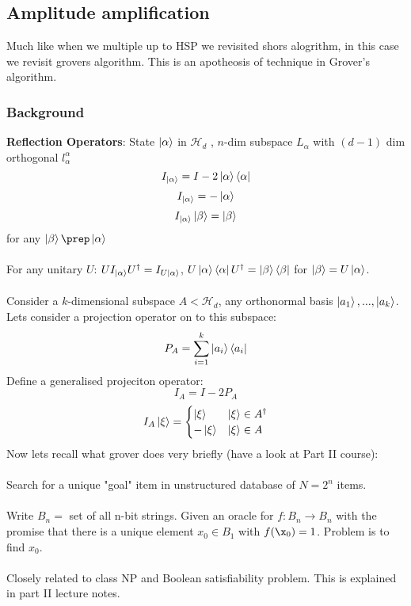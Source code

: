 \documentclass{article}
\begin{document}
               \subsection{Amplitude amplification}
Much like when we multiple up to HSP we revisited shors alogrithm, in this case we revisit grovers algorithm. This is an apotheosis of technique in Grover's algorithm.
\subsubsection{Background}
\textbf{Reflection Operators}:
State $\ket{\alpha}$ in $\mathcal{H}_{d}$ , $n$-dim subspace $L_{\alpha}$ with $(d-1)$ dim orthogonal $l_{\alpha}^{\alpha}$
$$
I_{\ket{\alpha}} = I - 2 \ket{\alpha} \bra{\alpha}
$$
$$
I_{\ket{\alpha}} = - \ket{\alpha}
$$
$$
I_{\ket{\alpha}} \ket{\beta} = \ket{\beta}
$$
for any $\ket{\beta} \prep \ket{\alpha}$\\\\
For any unitary $U$: $UI_{\ket{\alpha}} U^{\dagger} = I_{U\ket{\alpha}}$, $U \ket{\alpha} \bra{\alpha} U^{\dagger} = \ket{\beta} \bra{\beta}$ for $\ket{\beta} = U\ket{\alpha}$.\\\\
Consider a $k$-dimensional subspace $A < \mathcal{H}_d$, any orthonormal basis $\ket{a_1}, ..., \ket{a_k}$. Lets consider a projection operator on to this subspace:
$$
P_A = \sum_{i=1}^k \ket{a_i} \bra{a_i} 
$$
Define a generalised projeciton operator:
$$
I_A = I - 2 P_A
$$
$$
               I_A \ket{\xi} = \begin{cases} \ket{\xi} & \ket{\xi} \in A^{\dagger}\\
               - \ket{\xi} & \ket{\xi} \in A\end{cases}
$$
Now lets recall what grover does very briefly (have a look at Part II course):\\\\
Search for a unique "goal" item  in unstructured database of $N = 2^n$ items.\\\\
Write $B_n =$ set of all n-bit strings. Given an oracle for $f: B_n \rightarrow B_n$ with the promise that there is a unique element $x_0 \in B_1$ with $f(\x_0) = 1$. Problem is to find $x_0$.\\\\
Closely related to class NP and Boolean satisfiability problem. This is explained in part II lecture notes.
\end{document}
